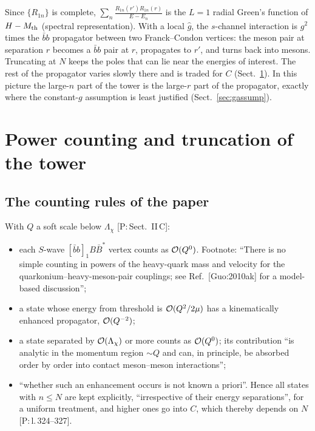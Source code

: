 \documentclass[11pt,a4paper]{article}
\newcommand{\tagP}[1]{\textcolor{blue!65!black}{\textsf{\small[P:\,#1]}}}
\newcommand{\tagD}{\textcolor{orange!85!black}{\textsf{\small[D]}}}
\newcommand{\BBst}{B\bar B^*}
\newcommand{\Mth}{M_{\rm th}}
\begin{document}
\begin{derbox}[What the full tower sum is \tagD]
Since $\{R_{1n}\}$ is complete, $\sum_{n}\frac{R_{1n}(r')R_{1n}(r)}{E-E_n}$ is the $L=1$ radial Green's function of $H-\Mth$ (spectral representation). With a local $\hat g$, the $s$-channel interaction is $g^2$ times the $\bar bb$ propagator between two Franck--Condon vertices: the meson pair at separation $r$ becomes a $\bar bb$ pair at $r$, propagates to $r'$, and turns back into mesons. Truncating at $N$ keeps the poles that can lie near the energies of interest. The rest of the propagator varies slowly there and is traded for $C$ (Sect.~\ref{sec:counting}). In this picture the large-$n$ part of the tower is the large-$r$ part of the propagator, exactly where the constant-$g$ assumption is least justified (Sect.~\ref{sec:gassump}).
\end{derbox}

\section{Power counting and truncation of the tower}
\label{sec:counting}

\subsection{The counting rules of the paper}

With $Q$ a soft scale below $\Lambda_\chi$ \tagP{Sect.~II\,C}:
\begin{itemize}
\item each $S$-wave $[\bar bb]_1\BBst$ vertex counts as ${\cal O}(Q^0)$. Footnote: ``There is no simple counting in powers of the heavy-quark mass and velocity for the quarkonium--heavy-meson-pair couplings; see Ref.~[Guo:2010ak] for a model-based discussion'';
\item a state whose energy from threshold is ${\cal O}(Q^2/2\mu)$ has a kinematically enhanced propagator, ${\cal O}(Q^{-2})$;
\item a state separated by ${\cal O}(\Lambda_\chi)$ or more counts as ${\cal O}(Q^0)$; its contribution ``is analytic in the momentum region $\sim Q$ and can, in principle, be absorbed order by order into contact meson--meson interactions'';
\item ``whether such an enhancement occurs is not known a priori''. Hence all states with $n\le N$ are kept explicitly, ``irrespective of their energy separations'', for a uniform treatment, and higher ones go into $C$, which thereby depends on $N$ \tagP{l.\,324--327}.
\end{itemize}
\end{document}

